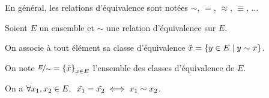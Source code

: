\begin{rem}
En général, les relations d'équivalence sont notées \(\sim\), \(=\), \(\approx\), \(\equiv\), ...
\end{rem}

\begin{defprop}
Soient \(E\) un ensemble et \(\sim\) une relation d'équivalence sur \(E\).

On associe à tout élément sa classe d'équivalence \(\tilde{x}=\left\lbrace y\in E\;\middle|\; y\sim x\right\rbrace\).

On note \(\nicefrac{E}{\sim}=\left\lbrace\tilde{x}\right\rbrace_{x\in E}\) l'ensemble des classes d'équivalence de \(E\).

On a \(\quantifs{\forall x_1,x_2\in E}\tilde{x_1}=\tilde{x_2}\iff x_1\sim x_2\).
\end{defprop}

